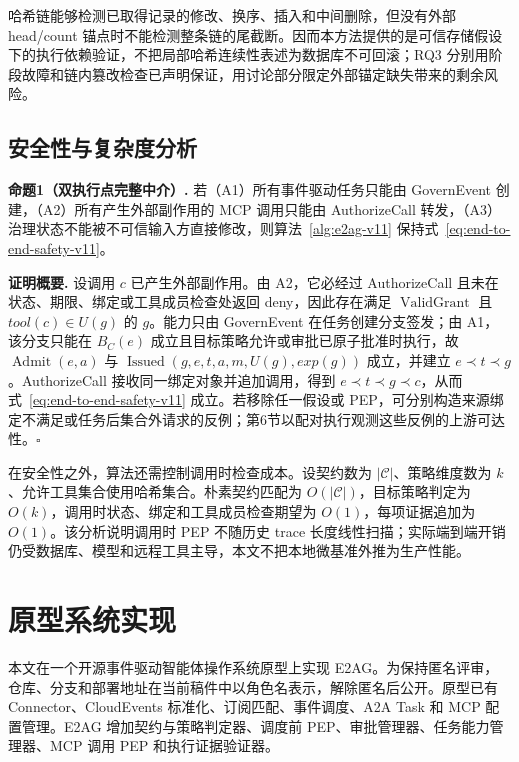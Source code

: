 哈希链能够检测已取得记录的修改、换序、插入和中间删除，但没有外部 head/count 锚点时不能检测整条链的尾截断。因而本方法提供的是可信存储假设下的执行依赖验证，不把局部哈希连续性表述为数据库不可回滚；RQ3 分别用阶段故障和链内篡改检查已声明保证，用讨论部分限定外部锚定缺失带来的剩余风险。

\subsection{安全性与复杂度分析}

\noindent\textbf{命题1（双执行点完整中介）.}
若（A1）所有事件驱动任务只能由 GovernEvent 创建，（A2）所有产生外部副作用的 MCP 调用只能由 AuthorizeCall 转发，（A3）治理状态不能被不可信输入方直接修改，则算法~\ref{alg:e2ag-v11} 保持式~\eqref{eq:end-to-end-safety-v11}。

\noindent\textbf{证明概要.}
设调用 $c$ 已产生外部副作用。由 A2，它必经过 AuthorizeCall 且未在状态、期限、绑定或工具成员检查处返回 deny，因此存在满足 $\operatorname{ValidGrant}$ 且 $tool(c)\in U(g)$ 的 $g$。能力只由 GovernEvent 在任务创建分支签发；由 A1，该分支只能在 $B_C(e)$ 成立且目标策略允许或审批已原子批准时执行，故 $\operatorname{Admit}(e,a)$ 与 $\operatorname{Issued}(g,e,t,a,m,U(g),exp(g))$ 成立，并建立 $e\prec t\prec g$。AuthorizeCall 接收同一绑定对象并追加调用，得到 $e\prec t\prec g\prec c$，从而式~\eqref{eq:end-to-end-safety-v11} 成立。若移除任一假设或 PEP，可分别构造来源绑定不满足或任务后集合外请求的反例；第6节以配对执行观测这些反例的上游可达性。\hfill$\square$

在安全性之外，算法还需控制调用时检查成本。设契约数为 $|\mathcal{C}|$、策略维度数为 $k$、允许工具集合使用哈希集合。朴素契约匹配为 $O(|\mathcal{C}|)$，目标策略判定为 $O(k)$，调用时状态、绑定和工具成员检查期望为 $O(1)$，每项证据追加为 $O(1)$。该分析说明调用时 PEP 不随历史 trace 长度线性扫描；实际端到端开销仍受数据库、模型和远程工具主导，本文不把本地微基准外推为生产性能。

\section{原型系统实现}\label{sec:implementation-v11}

本文在一个开源事件驱动智能体操作系统原型上实现 E2AG。为保持匿名评审，仓库、分支和部署地址在当前稿件中以角色名表示，解除匿名后公开。原型已有 Connector、CloudEvents 标准化、订阅匹配、事件调度、A2A Task 和 MCP 配置管理。E2AG 增加契约与策略判定器、调度前 PEP、审批管理器、任务能力管理器、MCP 调用 PEP 和执行证据验证器。

